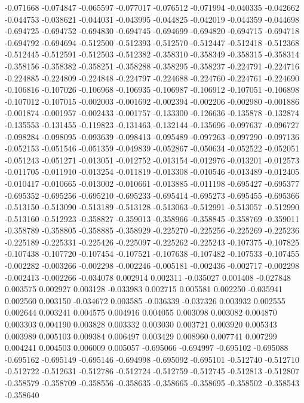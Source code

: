 -0.071668
-0.074847
-0.065597
-0.077017
-0.076512
-0.071994
-0.040335
-0.042662
-0.044753
-0.038621
-0.044031
-0.043995
-0.044825
-0.042019
-0.044359
-0.044698
-0.694725
-0.694752
-0.694830
-0.694745
-0.694699
-0.694820
-0.694715
-0.694718
-0.694792
-0.694694
-0.512500
-0.512393
-0.512570
-0.512447
-0.512418
-0.512368
-0.512445
-0.512591
-0.512503
-0.512382
-0.358310
-0.358349
-0.358315
-0.358314
-0.358156
-0.358382
-0.358251
-0.358288
-0.358295
-0.358237
-0.224791
-0.224716
-0.224885
-0.224809
-0.224848
-0.224797
-0.224688
-0.224760
-0.224761
-0.224690
-0.106816
-0.107026
-0.106968
-0.106935
-0.106987
-0.106912
-0.107051
-0.106898
-0.107012
-0.107015
-0.002003
-0.001692
-0.002394
-0.002206
-0.002980
-0.001886
-0.001874
-0.001957
-0.002433
-0.001757
-0.133300
-0.126636
-0.135878
-0.132874
-0.135553
-0.131455
-0.119823
-0.131463
-0.132144
-0.135696
-0.097637
-0.096727
-0.098284
-0.098095
-0.093639
-0.098413
-0.095489
-0.097263
-0.097290
-0.097136
-0.052153
-0.051546
-0.051359
-0.049839
-0.052867
-0.050634
-0.052522
-0.052051
-0.051243
-0.051271
-0.013051
-0.012752
-0.013154
-0.012976
-0.013201
-0.012573
-0.011705
-0.011910
-0.013254
-0.011819
-0.013308
-0.010546
-0.013489
-0.012405
-0.010417
-0.010665
-0.013002
-0.010661
-0.013885
-0.011198
-0.695427
-0.695377
-0.695352
-0.695256
-0.695210
-0.695233
-0.695414
-0.695273
-0.695455
-0.695366
-0.513150
-0.513090
-0.513189
-0.513128
-0.513063
-0.512991
-0.513057
-0.512990
-0.513160
-0.512923
-0.358827
-0.359013
-0.358966
-0.358845
-0.358769
-0.359011
-0.358789
-0.358805
-0.358885
-0.358929
-0.225270
-0.225256
-0.225269
-0.225236
-0.225189
-0.225331
-0.225426
-0.225097
-0.225262
-0.225243
-0.107375
-0.107825
-0.107438
-0.107720
-0.107454
-0.107521
-0.107638
-0.107482
-0.107533
-0.107455
-0.002282
-0.003266
-0.002298
-0.002246
-0.005181
-0.002436
-0.002717
-0.002298
-0.002413
-0.002266
-0.034078
0.002914
0.002311
-0.035027
0.001408
-0.027848
0.003575
0.002927
0.003128
-0.033983
0.002715
0.005581
0.002250
-0.035941
0.002560
0.003150
-0.034672
0.003585
-0.036339
-0.037326
0.003932
0.002555
0.002644
0.003241
0.004575
0.004916
0.004055
0.003098
0.003082
0.004870
0.003303
0.004190
0.003828
0.003332
0.003030
0.003721
0.003920
0.005343
0.003989
0.005103
0.009384
0.006497
0.003429
0.008960
0.007741
0.007299
0.004241
0.004503
0.006009
0.005057
-0.695066
-0.694997
-0.695102
-0.695088
-0.695162
-0.695149
-0.695146
-0.694998
-0.695092
-0.695101
-0.512740
-0.512710
-0.512722
-0.512631
-0.512786
-0.512724
-0.512759
-0.512745
-0.512813
-0.512807
-0.358579
-0.358709
-0.358556
-0.358635
-0.358665
-0.358695
-0.358502
-0.358543
-0.358640
